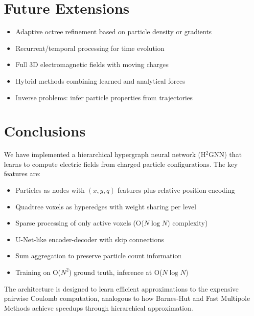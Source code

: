\documentclass[11pt,a4paper]{article}
\begin{document}
\section{Future Extensions}

\begin{itemize}
    \item Adaptive octree refinement based on particle density or gradients
    \item Recurrent/temporal processing for time evolution
    \item Full 3D electromagnetic fields with moving charges
    \item Hybrid methods combining learned and analytical forces
    \item Inverse problems: infer particle properties from trajectories
\end{itemize}

\section{Conclusions}

We have implemented a hierarchical hypergraph neural network (H$^2$GNN) that learns to compute electric fields from charged particle configurations. The key features are:
\begin{itemize}
    \item Particles as nodes with $(x, y, q)$ features plus relative position encoding
    \item Quadtree voxels as hyperedges with weight sharing per level
    \item Sparse processing of only active voxels (O($N \log N$) complexity)
    \item U-Net-like encoder-decoder with skip connections
    \item Sum aggregation to preserve particle count information
    \item Training on O($N^2$) ground truth, inference at O($N \log N$)
\end{itemize}

The architecture is designed to learn efficient approximations to the expensive pairwise Coulomb computation, analogous to how Barnes-Hut and Fast Multipole Methods achieve speedups through hierarchical approximation.
\end{document}
